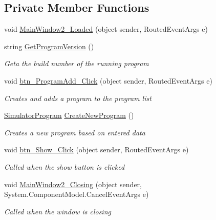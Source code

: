 \subsection*{Private Member Functions}
\begin{DoxyCompactItemize}
\item 
void \hyperlink{class_c_p_u___o_s___simulator_1_1_main_window_a3b945b691332686989cd5b5107f7f98b}{Main\+Window2\+\_\+\+Loaded} (object sender, Routed\+Event\+Args e)
\item 
string \hyperlink{class_c_p_u___o_s___simulator_1_1_main_window_a99cb5e507849facbb9f5f271736759f7}{Get\+Program\+Version} ()
\begin{DoxyCompactList}\small\item\em Geta the build number of the running program \end{DoxyCompactList}\item 
void \hyperlink{class_c_p_u___o_s___simulator_1_1_main_window_abe3e79941789134ce080390fcafc720e}{btn\+\_\+\+Program\+Add\+\_\+\+Click} (object sender, Routed\+Event\+Args e)
\begin{DoxyCompactList}\small\item\em Creates and adds a program to the program list \end{DoxyCompactList}\item 
\hyperlink{class_c_p_u___o_s___simulator_1_1_simulator_program}{Simulator\+Program} \hyperlink{class_c_p_u___o_s___simulator_1_1_main_window_a4cb75cfa224757b1dc708b60681ad803}{Create\+New\+Program} ()
\begin{DoxyCompactList}\small\item\em Creates a new program based on entered data \end{DoxyCompactList}\item 
void \hyperlink{class_c_p_u___o_s___simulator_1_1_main_window_afcb6e2b3719374f56fd8cb1c786bb219}{btn\+\_\+\+Show\+\_\+\+Click} (object sender, Routed\+Event\+Args e)
\begin{DoxyCompactList}\small\item\em Called when the show button is clicked \end{DoxyCompactList}\item 
void \hyperlink{class_c_p_u___o_s___simulator_1_1_main_window_a23734396aff1eb673bcdc671759c5776}{Main\+Window2\+\_\+\+Closing} (object sender, System.\+Component\+Model.\+Cancel\+Event\+Args e)
\begin{DoxyCompactList}\small\item\em Called when the window is closing \end{DoxyCompactList}\item 

\end{DoxyCompactItemize}
